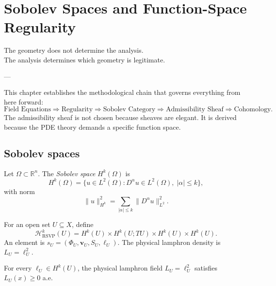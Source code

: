 
\chapter{Sobolev Spaces and Function-Space Regularity}
\label{ch:sobolev}

\epigraph{%
  The geometry does not determine the analysis.\\
  The analysis determines which geometry is legitimate.%
}{---}

\begin{WhyMatters}
  This chapter establishes the methodological chain that
  governs everything from here forward:
  \[
    \text{Field Equations}
    \Rightarrow \text{Regularity}
    \Rightarrow \text{Sobolev Category}
    \Rightarrow \text{Admissibility Sheaf}
    \Rightarrow \text{Cohomology.}
  \]
  The admissibility sheaf is not chosen because sheaves are
  elegant.
  It is derived because the PDE theory demands a specific
  function space.
\end{WhyMatters}

\section{Sobolev spaces}

\begin{definition}
  \label{def:sobolev}
  Let $\Omega \subset \mathbb{R}^n$.
  The \emph{Sobolev space} $H^k(\Omega)$ is
  \[
    H^k(\Omega)
    = \{u \in L^2(\Omega) : D^\alpha u \in L^2(\Omega),\;
      |\alpha| \leq k\},
  \]
  with norm
  \[
    \|u\|_{H^k}^2 = \sum_{|\alpha|\leq k} \|D^\alpha u\|_{L^2}^2.
  \]
\end{definition}

\begin{definition}
  \label{def:rsvp-sobolev}
  For an open set $U \subseteq X$, define
  \[
    \mathcal{H}^k_{\mathrm{RSVP}}(U)
    = H^k(U) \times H^k(U; TU) \times H^k(U) \times H^k(U).
  \]
  An element is $s_U = (\Phi_U, \mathbf{v}_U, S_U, \ell_U)$.
  The physical lamphron density is $L_U = \ell_U^2$.
\end{definition}

\begin{proposition}
  \label{prop:lamphron-positive}
  \statusproven{}
  For every $\ell_U \in H^k(U)$, the physical lamphron field
  $L_U = \ell_U^2$ satisfies $L_U(x) \geq 0$ a.e.
\end{proposition}

